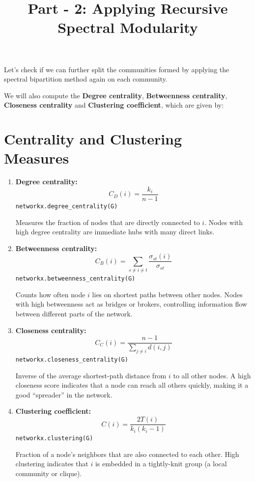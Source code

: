 \documentclass[a4paper,12pt]{article}
\begin{document}
\title{\textbf{Part - 2: Applying Recursive Spectral Modularity}}
\date{}

\maketitle

\noindent
Let's check if we can further split the communities formed by applying the spectral bipartition method again on each community.

\medskip

We will also compute the \textbf{Degree centrality}, \textbf{Betweenness centrality}, \textbf{Closeness centrality} and \textbf{Clustering coefficient}, which are given by:

\section*{Centrality and Clustering Measures}

\begin{enumerate}
    \item \textbf{Degree centrality:}
    \[
    C_D(i) = \frac{k_i}{n - 1}
    \]
    \texttt{networkx.degree\_centrality(G)}
    
    Measures the fraction of nodes that are directly connected to $i$. Nodes with high degree centrality are immediate hubs with many direct links.

    \item \textbf{Betweenness centrality:}
    \[
    C_B(i) = \sum_{s \neq i \neq t} \frac{\sigma_{st}(i)}{\sigma_{st}}
    \]
    \texttt{networkx.betweenness\_centrality(G)}
    
    Counts how often node $i$ lies on shortest paths between other nodes. Nodes with high betweenness act as bridges or brokers, controlling information flow between different parts of the network.

    \item \textbf{Closeness centrality:}
    \[
    C_C(i) = \frac{n - 1}{\sum_{j \neq i} d(i, j)}
    \]
    \texttt{networkx.closeness\_centrality(G)}
    
    Inverse of the average shortest-path distance from $i$ to all other nodes. A high closeness score indicates that a node can reach all others quickly, making it a good ``spreader'' in the network.

    \item \textbf{Clustering coefficient:}
    \[
    C(i) = \frac{2T(i)}{k_i (k_i - 1)}
    \]
    \texttt{networkx.clustering(G)}
    
    Fraction of a node's neighbors that are also connected to each other. High clustering indicates that $i$ is embedded in a tightly-knit group (a local community or clique).

\end{enumerate}
\end{document}
